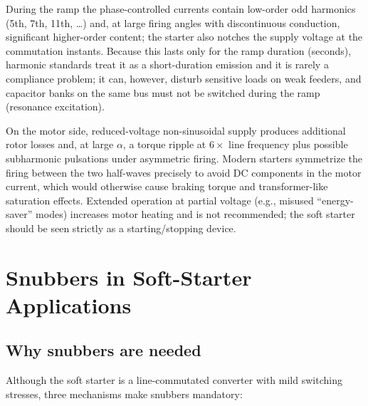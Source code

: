 \documentclass[11pt,a4paper]{article}
\begin{document}
During the ramp the phase-controlled currents contain low-order odd
harmonics (5th, 7th, 11th, \dots) and, at large firing angles with
discontinuous conduction, significant higher-order content; the starter also
notches the supply voltage at the commutation instants. Because this lasts
only for the ramp duration (seconds), harmonic standards treat it as a
short-duration emission and it is rarely a compliance problem; it can,
however, disturb sensitive loads on weak feeders, and capacitor banks on the
same bus must not be switched during the ramp (resonance excitation).

On the motor side, reduced-voltage non-sinusoidal supply produces additional
rotor losses and, at large $\alpha$, a torque ripple at $6\times$ line
frequency plus possible subharmonic pulsations under asymmetric firing.
Modern starters symmetrize the firing between the two half-waves precisely
to avoid DC components in the motor current, which would otherwise cause
braking torque and transformer-like saturation effects. Extended operation
at partial voltage (e.g., misused ``energy-saver'' modes) increases motor
heating and is not recommended; the soft starter should be seen strictly as
a starting/stopping device.

\section{Snubbers in Soft-Starter Applications}
\label{sec:snubbers}

\subsection{Why snubbers are needed}

Although the soft starter is a line-commutated converter with mild switching
stresses, three mechanisms make snubbers mandatory:
\end{document}
